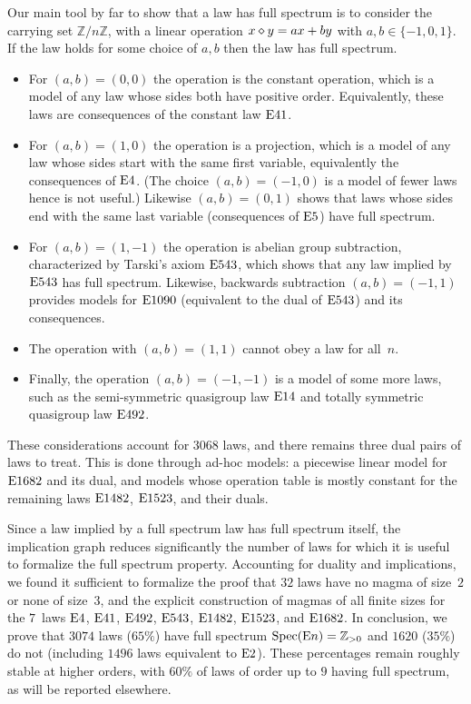Our main tool by far to show that a law has full spectrum is to consider the carrying set $\mathbb{Z}/n\mathbb{Z}$, with a linear operation $x\diamond y = ax+by$ with $a,b\in\{-1,0,1\}$.  If the law holds for some choice of $a,b$ then the law has full spectrum.
\begin{itemize}
\item For $(a,b)=(0,0)$ the operation is the constant operation, which is a model of any law whose sides both have positive order.  Equivalently, these laws are consequences of the constant law $\mathrm{E}41$.
\item For $(a,b)=(1,0)$ the operation is a projection, which is a model of any law whose sides start with the same first variable, equivalently the consequences of $\mathrm{E}4$.  (The choice $(a,b)=(-1,0)$ is a model of fewer laws hence is not useful.)  Likewise $(a,b)=(0,1)$ shows that laws whose sides end with the same last variable (consequences of $\mathrm{E}5$) have full spectrum.
\item For $(a,b)=(1,-1)$ the operation is abelian group subtraction, characterized by Tarski's axiom $\mathrm{E}543$, which shows that any law implied by $\mathrm{E}543$ has full spectrum.  Likewise, backwards subtraction $(a,b)=(-1,1)$ provides models for $\mathrm{E}1090$ (equivalent to the dual of $\mathrm{E}543$) and its consequences.
\item The operation with $(a,b)=(1,1)$ cannot obey a law for all~$n$.
\item Finally, the operation $(a,b)=(-1,-1)$ is a model of some more laws, such as the semi-symmetric quasigroup law $\mathrm{E}14$ and totally symmetric quasigroup law $\mathrm{E}492$.
\end{itemize}
These considerations account for $\num{3068}$ laws, and there remains three dual pairs of laws to treat.  This is done through ad-hoc models: a piecewise linear model for $\mathrm{E}1682$ and its dual, and models whose operation table is mostly constant for the remaining laws $\mathrm{E}1482$, $\mathrm{E}1523$, and their duals.

Since a law implied by a full spectrum law has full spectrum itself, the implication graph reduces significantly the number of laws for which it is useful to formalize the full spectrum property.  Accounting for duality and implications, we found it sufficient to formalize the proof that $32$ laws have no magma of size~$2$ or none of size~$3$, and the explicit construction of magmas of all finite sizes for the $7$~laws $\mathrm{E}4$, $\mathrm{E}41$, $\mathrm{E}492$, $\mathrm{E}543$, $\mathrm{E}1482$, $\mathrm{E}1523$, and $\mathrm{E}1682$.  In conclusion, we prove that $\num{3074}$ laws ($65\%$) have full spectrum $\operatorname{Spec}(\mathrm{E}n)=\mathbb{Z}_{>0}$ and $\num{1620}$ ($35\%$) do not (including $\num{1496}$ laws equivalent to $\mathrm{E}2$).  These percentages remain roughly stable at higher orders, with $60\%$ of laws of order up to $9$ having full spectrum, as will be reported elsewhere.
